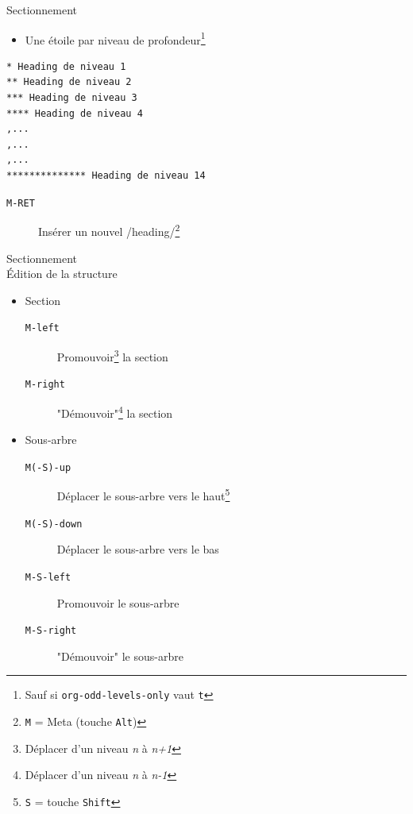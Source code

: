\documentclass[presentation,t,hideothersubsections]{beamer}
\begin{document}
\begin{frame}[fragile,label=sec-2-4-1]{Sectionnement}
 \begin{itemize}
\item Une étoile par niveau de profondeur\footnote{Sauf si \texttt{org-odd-levels-only} vaut \texttt{t}}
\end{itemize}

\lstset{language=org,numbers=none}
\begin{lstlisting}
* Heading de niveau 1
** Heading de niveau 2
*** Heading de niveau 3
**** Heading de niveau 4
,...
,...
,...
************** Heading de niveau 14
\end{lstlisting}

\begin{description}
\item[\texttt{M-RET}] Insérer un nouvel /heading/\footnote{\texttt{M} = Meta (touche \texttt{Alt})}
\end{description}
\end{frame}
\begin{frame}[fragile,label=sec-2-4-2]{Sectionnement \\ Édition de la structure}
 \begin{itemize}
\item \alert{Section}
\begin{description}
\item[\texttt{M-left}] Promouvoir\footnote{Déplacer d'un niveau \emph{n} à \emph{n+1}} la section
\item[\texttt{M-right}] "Démouvoir"\footnote{Déplacer d'un niveau \emph{n} à \emph{n-1}} la section
\end{description}

\item \alert{Sous-arbre}
\begin{description}
\item[\texttt{M(-S)-up}] Déplacer le sous-arbre vers le haut\footnote{\texttt{S} = touche \texttt{Shift}}
\item[\texttt{M(-S)-down}] Déplacer le sous-arbre vers le bas
\item[\texttt{M-S-left}] Promouvoir le sous-arbre
\item[\texttt{M-S-right}] "Démouvoir" le sous-arbre

\end{description}
\end{itemize}
\end{frame}
\end{document}
